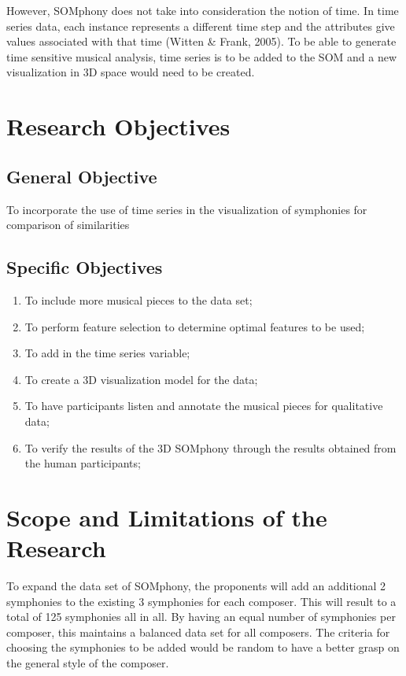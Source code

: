 However, SOMphony does not take into consideration the notion of time. In time series data, each instance represents a different time step and the attributes give values associated with that time (Witten  \& Frank, 2005).  To be able to generate time sensitive musical analysis, time series is to be added to the SOM and a new visualization in 3D space would need to be created.

\section{Research Objectives}
\label{sec:researchobjectives}
\subsection{General Objective}
\label{sec:generalobjective}
To incorporate the use of time series in the visualization of symphonies for comparison of similarities
\subsection{Specific Objectives}
\label{sec:specificobjectives}
\begin{enumerate}
\item To include more musical pieces to the data set;
\item To perform feature selection to determine optimal features to be used;
\item To add in the time series variable;
\item To create a 3D visualization model for the data;
\item To have participants listen and annotate the musical pieces for qualitative data;
\item To verify the results of the 3D SOMphony through the results obtained from the human participants;
\end{enumerate}
\section{Scope and Limitations of the Research}
\label{sec:scopelimitations}
To expand the data set of SOMphony, the proponents will add an additional 2 symphonies to the existing 3 symphonies for each composer. This will result to a total of 125 symphonies all in all. By having an equal number of symphonies per composer, this maintains a balanced data set for all composers. The criteria for choosing the symphonies to be added would be random to have a better grasp on the general style of the composer.


